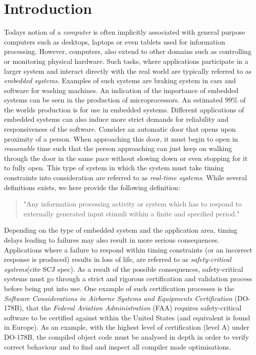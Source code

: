 \chapter{Introduction}
\label{chapter:introduction}
Todays notion of a \textit{computer} is often implicitly associated with general purpose computers such as desktops, laptops or even tablets used for information processing. However, computers, also extend to other domains such as controlling or monitoring physical hardware. Such tasks, where applications participate in a larger system and interact directly with the real world are typically referred to as \textit{embedded systems}. Examples of such systems are braking system in cars and software for washing machines. An indication of the importance of embedded systems can be seen in the production of microprocessors. An estimated 99\% of the worlds production is for use in embedded systems\cite{alan2001real}. Different applications of embedded systems can also induce more strict demands for reliability and responsiveness of the software. Consider an automatic door that opens upon proximity of a person. When approaching this door, it must begin to open in \textit{reasonable} time such that the person approaching can just keep on walking through the door in the same pace without slowing down or even stopping for it to fully open. This type of system in which the system must take timing constraints into consideration are referred to as \textit{real-time systems}. While several definitions exists, we here provide the following definition:

\begin{quotation}
"Any information processing activity or system which has to respond to externally generated input stimuli within a finite and specified period."~\cite{alan2001real}
\end{quotation}

Depending on the type of embedded system and the application area, timing delays leading to failures may also result in more serious consequences. Applications where a failure to respond within timing constraints (or an incorrect response is produced) results in loss of life, are referred to as \textit{safety-critical systems}(cite SCJ spec). As a result of the possible consequences, safety-critical systems must go through a strict and rigorous certification and validation process before being put into use. One example of such certification processes is the \textit{Software Considerations in Airborne Systems and Equipments Certification} (DO-178B)\cite{DO178B}, that the \textit{Federal Aviation Administration} (FAA) requires safety-critical software to be certified against within the United States (and equivalent is found in Europe). As an example, with the highest level of certification (level A) under DO-178B, the compiled object code must be analysed in depth in order to verify correct behaviour and to find and inspect all compiler made optimisations\cite{DO178B-Example}.


